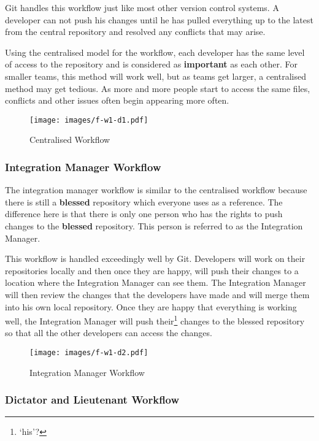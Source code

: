Git handles this workflow just like most other version control systems.
A developer can not push his changes until he has pulled everything up to the latest from the central repository and resolved any conflicts that may arise.

Using the centralised model for the workflow, each developer has the same level of access to the repository and is considered as \textbf{important} as each other.
For smaller teams, this method will work well, but as teams get larger, a centralised method may get tedious.
As more and more people start to access the same files, conflicts and other issues often begin appearing more often.

\begin{figure}[bt]
	\centering
	\texttt{[image: images/f-w1-d1.pdf]}
	\caption{Centralised Workflow}
\end{figure}

\subsubsection{Integration Manager Workflow}
The integration manager workflow is similar to the centralised workflow because there is still a \textbf{blessed} repository which everyone uses as a reference.
The difference here is that there is only one person who has the rights to push changes to the \textbf{blessed} repository.
This person is referred to as the Integration Manager.

This workflow is handled exceedingly well by Git.
Developers will work on their repositories locally and then once they are happy, will push their changes to a location where the Integration Manager can see them.
The Integration Manager will then review the changes that the developers have made and will merge them into his own local repository.
Once they are happy that everything is working well, the Integration Manager will push their\footnote{`his'?} changes to the blessed repository so that all the other developers can access the changes.

\begin{figure}[bt]
	\centering
	\texttt{[image: images/f-w1-d2.pdf]}
	\caption{Integration Manager Workflow}
\end{figure}

\subsubsection{Dictator and Lieutenant Workflow}

